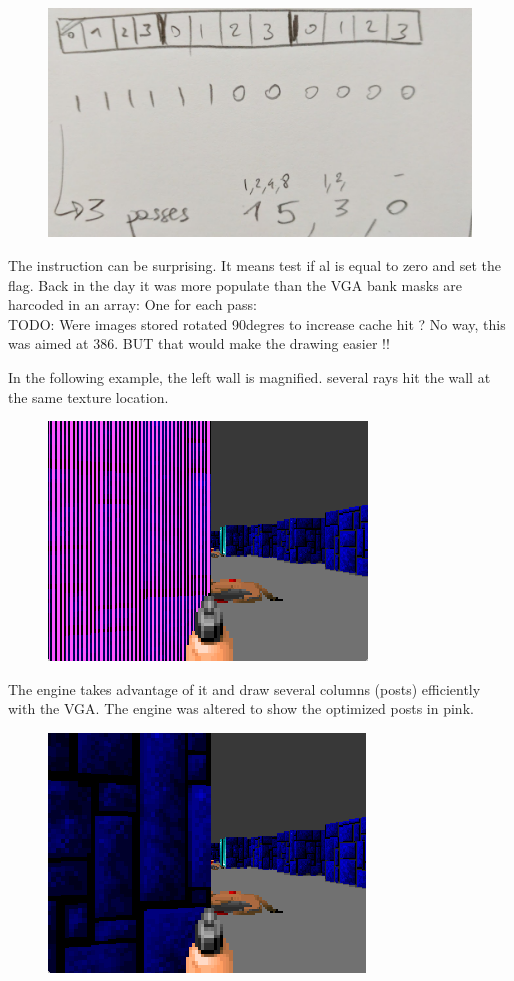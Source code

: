  \begin{figure}[H]
 \centering
 \includegraphics[scale=0.3]{imgs/scalePost_explanation2.png}
 \end{figure}
The instruction  can be surprising. It means test if al is equal to zero and set the flag. Back in the day it was more populate than 
 the VGA bank masks are harcoded in an array: One for each pass:\\

TODO: Were images stored rotated 90degres to increase cache hit ? No way, this was aimed at 386. BUT that would make the drawing easier !!

In the following example, the left wall is magnified. several rays hit the wall at the same texture location.
\begin{figure}[H]
 \centering
 \includegraphics[scale=1.3]{imgs/post_optimization_1_pink_show.png}
\end{figure}
The engine takes advantage of it and draw several columns (posts) efficiently with the VGA. The engine was altered to show the optimized posts in pink.
\begin{figure}[H]
 \centering
 \includegraphics[scale=1.3]{imgs/post_optimization_1_show.png}
\end{figure}

